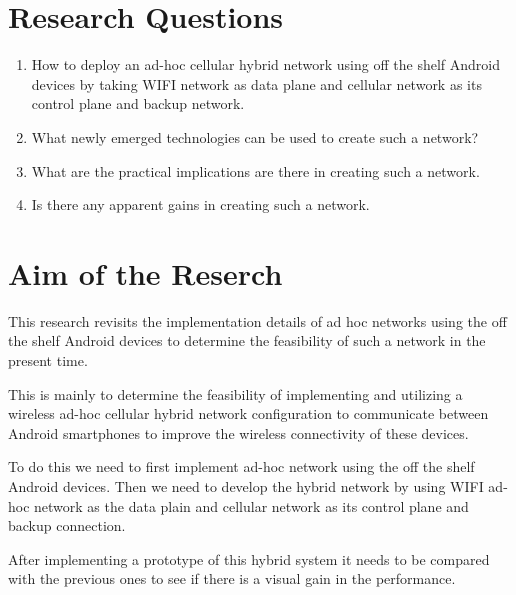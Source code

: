 \vspace{12pt}
\vspace{12pt}
\clearpage

\section{Research Questions}
\vspace{12pt}

\begin{enumerate}
  \item How to deploy an ad-hoc cellular hybrid network using off the shelf Android devices by taking  WIFI  network as data plane and cellular network as its control plane and backup network.
  \item What newly emerged technologies can be used to create such a network?
  \item What are the practical implications are there in creating such a network.
  \item Is there any apparent gains in creating such a network.
\end{enumerate}

\vspace{12pt}



\section{Aim of the Reserch}
\vspace{12pt}
This research revisits the implementation details of ad hoc networks using the off the shelf Android devices to determine the feasibility of such a network in the present time.

\vspace{12pt}
This is mainly to determine the feasibility of implementing and utilizing a wireless ad-hoc cellular hybrid network configuration to communicate between Android smartphones to improve the wireless connectivity of these devices.

\vspace{12pt}
To do this we need to first implement ad-hoc network using the off the shelf Android devices. Then we need to develop the hybrid network by using  WIFI  ad-hoc network as the data plain and cellular network as its control plane and backup connection.

\vspace{12pt}
After implementing a prototype of this hybrid system it needs to be compared with the previous ones to see if there is a visual gain in the performance.

